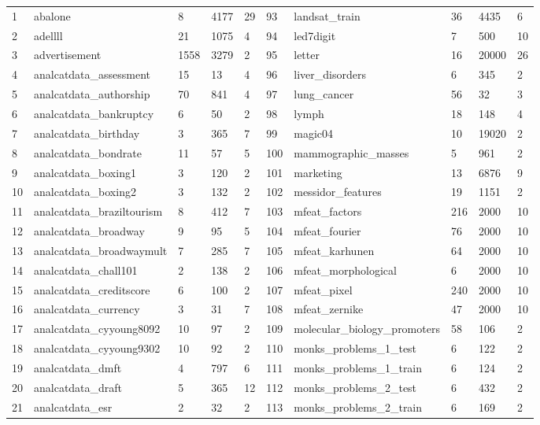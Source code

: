 \documentclass[review,3p]{elsarticle}
\begin{document}
\begin{longtable}{p{0.1cm}lp{0.8cm}<{\centering}p{0.8cm}<{\centering}p{0.9cm}<{\centering}|p{0.1cm}lp{0.8cm}<{\centering}p{0.8cm}<{\centering}p{0.9cm}<{\centering}}
			1	&	abalone	&	8	&	4177	&	29	&	93	&	landsat\_train	&	36	&	4435	&	6	\\
			2	&	adellll	&	21	&	1075	&	4	&	94	&	led7digit	&	7	&	500	&	10	\\
			3	&	advertisement	&	1558	&	3279	&	2	&	95	&	letter	&	16	&	20000	&	26	\\
			4	&	analcatdata\_assessment	&	15	&	13	&	4	&	96	&	liver\_disorders	&	6	&	345	&	2	\\
			5	&	analcatdata\_authorship	&	70	&	841	&	4	&	97	&	lung\_cancer	&	56	&	32	&	3	\\
			6	&	analcatdata\_bankruptcy	&	6	&	50	&	2	&	98	&	lymph	&	18	&	148	&	4	\\
			7	&	analcatdata\_birthday	&	3	&	365	&	7	&	99	&	magic04	&	10	&	19020	&	2	\\
			8	&	analcatdata\_bondrate	&	11	&	57	&	5	&	100	&	mammographic\_masses	&	5	&	961	&	2	\\
			9	&	analcatdata\_boxing1	&	3	&	120	&	2	&	101	&	marketing	&	13	&	6876	&	9	\\
			10	&	analcatdata\_boxing2	&	3	&	132	&	2	&	102	&	messidor\_features	&	19	&	1151	&	2	\\
			11	&	analcatdata\_braziltourism	&	8	&	412	&	7	&	103	&	mfeat\_factors	&	216	&	2000	&	10	\\
			12	&	analcatdata\_broadway	&	9	&	95	&	5	&	104	&	mfeat\_fourier	&	76	&	2000	&	10	\\
			13	&	analcatdata\_broadwaymult	&	7	&	285	&	7	&	105	&	mfeat\_karhunen	&	64	&	2000	&	10	\\
			14	&	analcatdata\_chall101	&	2	&	138	&	2	&	106	&	mfeat\_morphological	&	6	&	2000	&	10	\\
			15	&	analcatdata\_creditscore	&	6	&	100	&	2	&	107	&	mfeat\_pixel	&	240	&	2000	&	10	\\
			16	&	analcatdata\_currency	&	3	&	31	&	7	&	108	&	mfeat\_zernike	&	47	&	2000	&	10	\\
			17	&	analcatdata\_cyyoung8092	&	10	&	97	&	2	&	109	&	molecular\_biology\_promoters	&	58	&	106	&	2	\\
			18	&	analcatdata\_cyyoung9302	&	10	&	92	&	2	&	110	&	monks\_problems\_1\_test	&	6	&	122	&	2	\\
			19	&	analcatdata\_dmft	&	4	&	797	&	6	&	111	&	monks\_problems\_1\_train	&	6	&	124	&	2	\\
			20	&	analcatdata\_draft	&	5	&	365	&	12	&	112	&	monks\_problems\_2\_test	&	6	&	432	&	2	\\
			21	&	analcatdata\_esr	&	2	&	32	&	2	&	113	&	monks\_problems\_2\_train	&	6	&	169	&	2	\\

\end{longtable}
\end{document}
